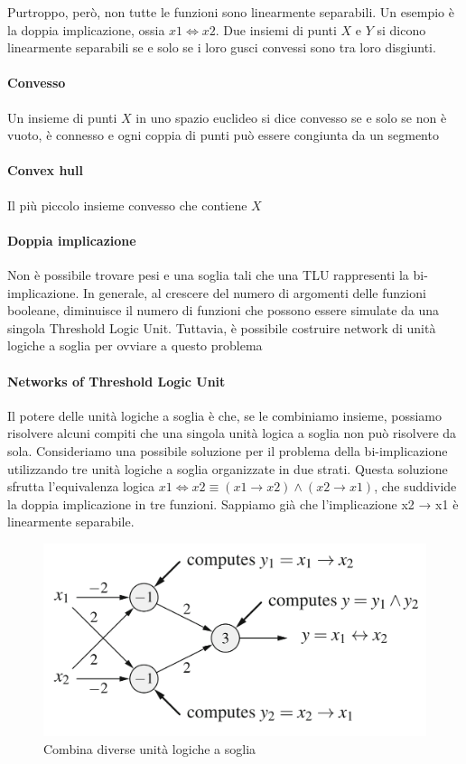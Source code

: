 Purtroppo, però, non tutte le funzioni sono linearmente separabili. Un esempio è la doppia implicazione, ossia $x1 \iff x2$. Due insiemi di punti $X$ e $Y$ si dicono linearmente separabili se e solo se i loro gusci convessi sono tra loro disgiunti.

\paragraph{Convesso}
Un insieme di punti $X$ in uno spazio euclideo si dice convesso se e solo se non è vuoto, è connesso e ogni coppia di punti può essere congiunta da un segmento

\paragraph{Convex hull}
Il più piccolo insieme convesso che contiene $X$

\paragraph{Doppia implicazione}
Non è possibile trovare pesi e una soglia tali che una TLU rappresenti la bi-implicazione. In generale, al crescere del numero di argomenti delle funzioni booleane, diminuisce il numero di funzioni che possono essere simulate da una singola Threshold Logic Unit. Tuttavia, è possibile costruire network di unità logiche a soglia per ovviare a questo problema

\paragraph{Networks of Threshold Logic Unit}
Il potere delle unità logiche a soglia è che, se le combiniamo insieme, possiamo risolvere alcuni compiti che una singola unità logica a soglia non può risolvere da sola. Consideriamo una possibile soluzione per il problema della bi-implicazione utilizzando tre unità logiche a soglia organizzate in due strati. Questa soluzione sfrutta l'equivalenza logica
$x1 \iff x2 \equiv (x1 \rightarrow x2) \land (x2 \rightarrow x1)$, che suddivide la doppia implicazione in tre funzioni. Sappiamo già che l'implicazione x2 → x1 è linearmente separabile.

\begin{figure}[h]
    \centering
    \includegraphics[scale=0.45]{images/tlu-bi-implicazione.png}
    \caption{Combina diverse unità logiche a soglia}
\end{figure}

